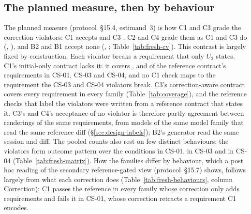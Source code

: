 \subsection{The planned measure, then by behaviour}
\label{sec:results-planned}
The planned measure (protocol~\S15.4, estimand~3) is how C1 and C3 grade the correction violators: C1 accepts  and C3 . C2 and C4 grade them as C1 and C3 do (, ), and B2 and B1 accept none (, ; Table~\ref{tab:fresh-cv}). This contrast is largely fixed by construction. Each violator breaks a requirement that only $U_2$ states. C1's initial-only contract lacks it: it covers ,  and  of the reference contract's requirements in CS-01, CS-03 and CS-04, and no C1 check maps to the requirement the CS-03 and CS-04 violators break. C3's correction-aware contract covers every requirement in every family (Table~\ref{tab:coverage}), and the reference checks that label the violators were written from a reference contract that states it. C3's and C4's acceptance of no violator is therefore partly agreement between renderings of the same requirements, from models of the same model family that read the same reference diff (\S\ref{sec:design-labels}); B2's generator read the same session and diff. The pooled counts also rest on few distinct behaviours: the violators form  outcome pattern over the  conditions in CS-01,  in CS-03 and  in CS-04 (Table~\ref{tab:fresh-matrix}). How the families differ by behaviour, which a post hoc reading of the secondary reference-gated view (protocol~\S15.7) shows, follows largely from what each correction does (Table~\ref{tab:fresh-behaviours}, column Correction): C1 passes the reference in every family whose correction only adds requirements and fails it in CS-01, whose correction retracts a requirement C1 encodes.



